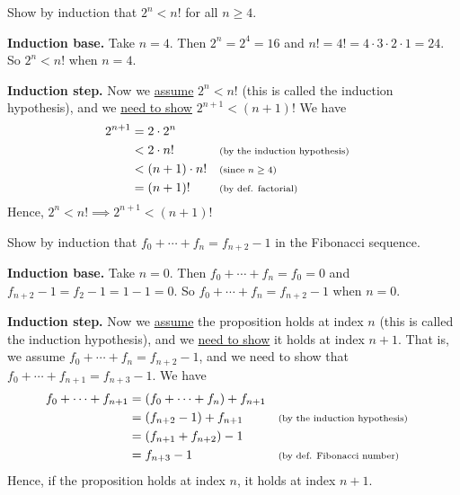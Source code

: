 \documentclass[10pt]{beamer}
\begin{document}
\begin{frame}
\begin{mygreenbox}[title=Exercise 2]
 Show by induction that $2^n < n!$ for all $n \geq 4$.	
\end{mygreenbox}

\vfill \vfill 
\begin{myyellowbox}[title=Solution]
\textbf{Induction base.} Take $n=4$.  Then $2^n = 2^4 = 16$ and $n! = 4! = 4 \cdot 3 \cdot 2 \cdot 1 = 24$. So $2^n < n!$ when $n=4$.

\vspace{0.5cm}

\textbf{Induction step.} Now we \underline{assume} $2^n<n!$ (this is called the \alert{induction hypothesis}), and we \underline{need to show} $2^{n+1}<(n+1)!$ We have
%
\begin{align*}
2^{n+1} &= 2 \cdot 2^n \\
&< 2 \cdot n! && \text{\scriptsize{{(by the induction hypothesis)}}} \\
&< (n+1) \cdot n! && \text{\scriptsize{{(since $n \geq 4$)}}} \\
&= (n+1)! && \text{\scriptsize{{(by def. factorial)}}}	
\end{align*}
Hence, $2^n<n! \implies 2^{n+1}<(n+1)!$
\end{myyellowbox}
\end{frame}




\begin{frame}

\begin{mygreenbox}[title=Exercise 3]
Show by induction that $f_0 + \cdots + f_n = f_{n+2} -1$ in the Fibonacci sequence.	
\end{mygreenbox}

\vfill \vfill 
\begin{myyellowbox}[title=Solution]
\textbf{Induction base.} Take $n=0$.  Then $f_0 + \cdots + f_n = f_0 =0$ and $f_{n+2} -1 = f_2 -1 = 1-1 = 0$. So $f_0 + \cdots + f_n = f_{n+2} -1$ when $n=0$.

\vspace{0.25cm}

\textbf{Induction step.} Now we \underline{assume} the proposition holds at index $n$ (this is called the \alert{induction hypothesis}), and we \underline{need to show} it holds at index $n+1$.  That is, we assume $f_0 + \cdots + f_n = f_{n+2} -1$, and we need to show that $f_0 + \cdots + f_{n+1} = f_{n+3} -1$.  We have
%
\begin{align*}
f_0 + \cdots + f_{n+1} &= (f_0 + \cdots + f_n) + f_{n+1} \\
&=(f_{n+2} -1) + f_{n+1} && \text{\scriptsize{{(by the induction hypothesis)}}} \\
&= (f_{n+1}+f_{n+2}) -1  && \\
&= f_{n+3} -1  && \text{\scriptsize{{(by def. Fibonacci number)}}}	
\end{align*}
Hence, if the proposition holds at index $n$, it holds at index $n+1$.
\end{myyellowbox}
	
\end{frame}
\end{document}
